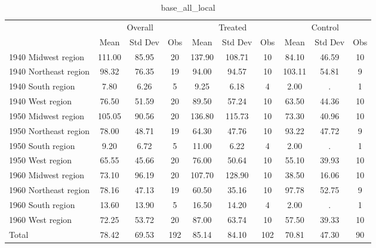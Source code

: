 \begin{table}[htbp]\centering
\def\sym#1{\ifmmode^{#1}\else\(^{#1}\)\fi}
\caption{base\_all\_local \label{tab1}}
\begin{tabular}{l*{3}{ccc}}
\toprule
                    &\multicolumn{3}{c}{Overall}           &\multicolumn{3}{c}{Treated}           &\multicolumn{3}{c}{Control}           \\
                    &        Mean&     Std Dev&         Obs&        Mean&     Std Dev&         Obs&        Mean&     Std Dev&         Obs\\
\midrule
1940 Midwest region &      111.00&       85.95&          20&      137.90&      108.71&          10&       84.10&       46.59&          10\\
1940 Northeast region&       98.32&       76.35&          19&       94.00&       94.57&          10&      103.11&       54.81&           9\\
1940 South region   &        7.80&        6.26&           5&        9.25&        6.18&           4&        2.00&           .&           1\\
1940 West region    &       76.50&       51.59&          20&       89.50&       57.24&          10&       63.50&       44.36&          10\\
1950 Midwest region &      105.05&       90.56&          20&      136.80&      115.73&          10&       73.30&       40.96&          10\\
1950 Northeast region&       78.00&       48.71&          19&       64.30&       47.76&          10&       93.22&       47.72&           9\\
1950 South region   &        9.20&        6.72&           5&       11.00&        6.22&           4&        2.00&           .&           1\\
1950 West region    &       65.55&       45.66&          20&       76.00&       50.64&          10&       55.10&       39.93&          10\\
1960 Midwest region &       73.10&       96.19&          20&      107.70&      128.90&          10&       38.50&       16.06&          10\\
1960 Northeast region&       78.16&       47.13&          19&       60.50&       35.16&          10&       97.78&       52.75&           9\\
1960 South region   &       13.60&       13.90&           5&       16.50&       14.20&           4&        2.00&           .&           1\\
1960 West region    &       72.25&       53.72&          20&       87.00&       63.74&          10&       57.50&       39.33&          10\\
Total               &       78.42&       69.53&         192&       85.14&       84.10&         102&       70.81&       47.30&          90\\
\bottomrule
\end{tabular}
\end{table}
